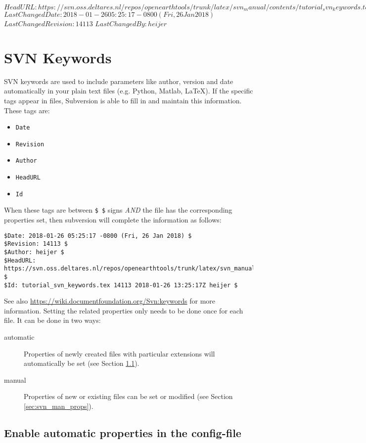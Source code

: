 \svnidlong
{$HeadURL: https://svn.oss.deltares.nl/repos/openearthtools/trunk/latex/svn_manual/contents/tutorial_svn_keywords.tex $}
{$LastChangedDate: 2018-01-26 05:25:17 -0800 (Fri, 26 Jan 2018) $}
{$LastChangedRevision: 14113 $}
{$LastChangedBy: heijer $}

\section{SVN Keywords}
SVN keywords are used to include parameters like author, version and date automatically in your plain text files (e.g. Python, Matlab, La\TeX).
If the specific tags appear in files, Subversion is able to fill in and maintain this information.
These tags are:
\begin{itemize}
\item \verb!Date!
\item \verb!Revision!
\item \verb!Author!
\item \verb!HeadURL!
\item \verb!Id!
\end{itemize}
When these tags are between \verb!$ $! signs \emph{AND} the file has the corresponding properties set, then subversion will complete the information as follows:
\begin{verbatim}
$Date: 2018-01-26 05:25:17 -0800 (Fri, 26 Jan 2018) $
$Revision: 14113 $
$Author: heijer $
$HeadURL: https://svn.oss.deltares.nl/repos/openearthtools/trunk/latex/svn_manual/contents/tutorial_svn_keywords.tex $
$Id: tutorial_svn_keywords.tex 14113 2018-01-26 13:25:17Z heijer $
\end{verbatim}
See also \url{https://wiki.documentfoundation.org/Svn:keywords} for more information.
Setting the related properties only needs to be done once for each file.
It can be done in two ways:
\begin{description}
\item[automatic] Properties of newly created files with particular extensions will automatically be set (see Section \ref{sec:svn_auto_props}).
\item[manual] Properties of new or existing files can be set or modified (see Section \ref{sec:svn_man_props}).
\end{description}

\subsection{Enable automatic properties in the config-file}
\label{sec:svn_auto_props}

